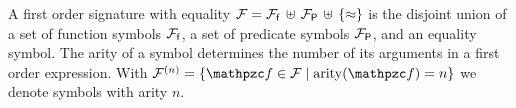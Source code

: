 
\begin{definition}\label{def:signature}
A 
first order 
{\myem signature} with equality
${\mathcal F} = {{\mathcal F}_{\mathsf f}}\,\uplus\,{{\mathcal F}_{\mathsf P}}\,\uplus\,\{\approx\}$ 
is the disjoint union of 
a set of {\myem function symbols} ${{\mathcal F}_{\mathsf f}}$,
a set of {\myem predicate symbols} ${{\mathcal F}_{\mathsf P}}$,
and an equality symbol.
%
The {\myem arity} of a symbol determines the number of its arguments in a first order expression.
With $\mcFn = \{ \mcf\in\mcF \mid \arity(\mcf) = n \}$ we denote symbols with arity $n$.
\end{definition}
